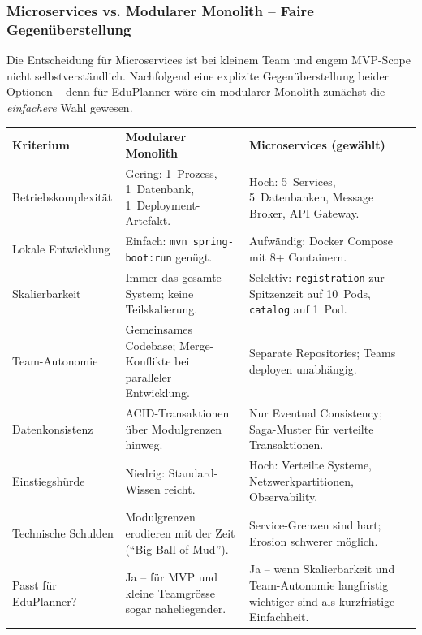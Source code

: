 \subsubsection{Microservices vs. Modularer Monolith -- Faire Gegenüberstellung}

\begin{reviewbox}
Die Entscheidung für Microservices ist bei kleinem Team und engem MVP-Scope nicht
selbstverständlich. Nachfolgend eine explizite Gegenüberstellung beider Optionen --
denn für EduPlanner wäre ein modularer Monolith zunächst die \emph{einfachere}
Wahl gewesen.
\end{reviewbox}

\begin{tabularx}{\textwidth}{L{4cm} X X}
  \color{white}\textbf{Kriterium} &
  \color{white}\textbf{Modularer Monolith} &
  \color{white}\textbf{Microservices (gewählt)} \\
  Betriebskomplexität &
  Gering: 1~Prozess, 1~Datenbank, 1~Deployment-Artefakt. &
  Hoch: 5~Services, 5~Datenbanken, Message Broker, API Gateway. \\
  Lokale Entwicklung &
  Einfach: \texttt{mvn spring-boot:run} genügt. &
  Aufwändig: Docker Compose mit 8+ Containern. \\
  Skalierbarkeit &
  Immer das gesamte System; keine Teilskalierung. &
  Selektiv: \texttt{registration} zur Spitzenzeit auf 10~Pods,
  \texttt{catalog} auf 1~Pod. \\
  Team-Autonomie &
  Gemeinsames Codebase; Merge-Konflikte bei paralleler Entwicklung. &
  Separate Repositories; Teams deployen unabhängig. \\
  Datenkonsistenz &
  ACID-Transaktionen über Modulgrenzen hinweg. &
  Nur Eventual Consistency; Saga-Muster für verteilte Transaktionen. \\
  Einstiegshürde &
  Niedrig: Standard-Wissen reicht. &
  Hoch: Verteilte Systeme, Netzwerkpartitionen, Observability. \\
  Technische Schulden &
  Modulgrenzen erodieren mit der Zeit (``Big Ball of Mud''). &
  Service-Grenzen sind hart; Erosion schwerer möglich. \\
  Passt für EduPlanner? &
  Ja -- für MVP und kleine Teamgrösse sogar naheliegender. &
  Ja -- wenn Skalierbarkeit und Team-Autonomie langfristig wichtiger
  sind als kurzfristige Einfachheit. \\
\end{tabularx}


